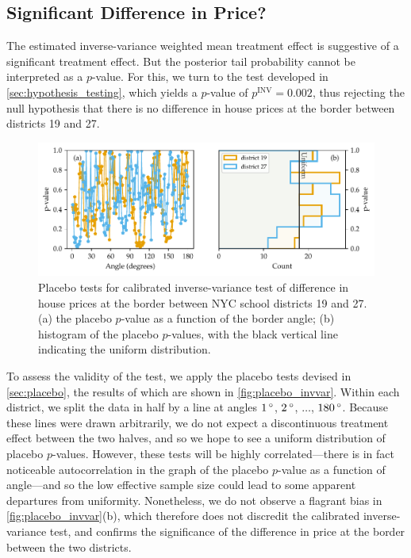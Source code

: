 \subsection{Significant Difference in Price?}
The estimated inverse-variance weighted mean treatment effect is suggestive of a significant treatment effect.
But the posterior tail probability cannot be interpreted as a \(p\)-value.
For this, we turn to the test developed in \autoref{sec:hypothesis_testing}, which yields a \(p\)-value of \(p^{\mathrm{INV}}=0.002\), thus rejecting the null hypothesis that there is no difference in house prices at the border between districts 19 and 27.

\begin{figure}[tb]
    \centering
    \includegraphics[width=\textwidth,height=0.3\textheight,keepaspectratio]{figures/placebo_invvar.pdf}
    \caption{\label{fig:placebo_invvar} Placebo tests for calibrated inverse-variance test of difference in house prices at the border between NYC school districts 19 and 27. 
    (a) the placebo \(p\)-value as a function of the border angle;
    (b) histogram of the placebo \(p\)-values, with the black vertical line indicating the uniform distribution.}
\end{figure}

To assess the validity of the test, we apply the placebo tests devised in \autoref{sec:placebo},
the results of which are shown in \autoref{fig:placebo_invvar}.
Within each district, we split the data in half by a line at angles \(1{\,^\circ}\), \(2{\,^\circ}\), \(\dotsc\), \(180{\,^\circ}\).
Because these lines were drawn arbitrarily, we do not expect a discontinuous treatment effect between the two halves, and so we hope to see a uniform distribution of placebo \(p\)-values.
However, these tests will be highly correlated---there is in fact noticeable autocorrelation in the graph of the placebo \(p\)-value as a function of angle---and so the low effective sample size could lead to some apparent departures from uniformity.
Nonetheless, we do not observe a flagrant bias in \autoref{fig:placebo_invvar}(b), which therefore does not discredit the calibrated inverse-variance test, and confirms the significance of the difference in price at the border between the two districts.

